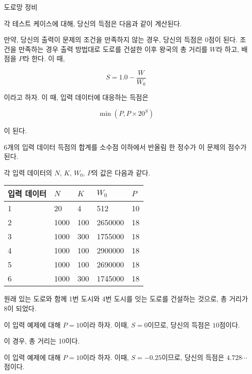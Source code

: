 \begin{problem}{도로망 정비}
\begin{itemize}
\end{itemize}

\Scoring

각 테스트 케이스에 대해, 당신의 득점은 다음과 같이 계산된다.

만약, 당신의 출력이 문제의 조건을 만족하지 않는 경우, 당신의 득점은 0점이 된다. 조건을 만족하는 경우 출력 방법대로 도로를 건설한 이후 왕국의 총 거리를 $W$라 하고, 배점을 $P$라 한다. 이 때,

$$ S = 1.0 - \dfrac{W}{W_0} $$

이라고 하자. 이 때, 입력 데이터에 대응하는 득점은

$$\min(P, P\times 20^S)$$

이 된다. 

6개의 입력 데이터 득점의 합계를 소수점 이하에서 반올림 한 정수가 이 문제의 점수가 된다.

각 입력 데이터의 $N$, $K$, $W_0$, $P$의 값은 다음과 같다.

\begin{tabular}{|l|l|l|l|l|}
	\hline
	입력 데이터 & $N$ & $K$ & $W_0$ & $P$ \\ \hline
	1      & 20 & 4 & 512 & 10 \\ \hline
	2      & 1000 & 100 & 2650000 & 18 \\ \hline
	3      & 1000 & 300 & 1755000 & 18 \\ \hline
	4      & 1000 & 100 & 2900000 & 18 \\ \hline
	5      & 1000 & 100 & 2690000 & 18 \\ \hline
	6      & 1000 & 300 & 1745000 & 18 \\ \hline 
\end{tabular}

\Examples


\renewcommand{\InputFileName}{Sample Input}
\renewcommand{\OutputFileName}{Sample Output}

\begin{example}
\end{example}

원래 있는 도로와 함께 1번 도시와 4번 도시를 잇는 도로를 건설하는 것으로, 총 거리가 8이 되었다.

이 입력 예제에 대해 $P=10$이라 하자. 이때, $S=0$이므로, 당신의 득점은 $10$점이다.

\begin{example}
\end{example}


이 경우, 총 거리는 10이다.

이 입력 예제에 대해 $P=10$이라 하자. 이때, $S=-0.25$이므로, 당신의 득점은 $4.728\cdots$점이다.



\end{problem}

